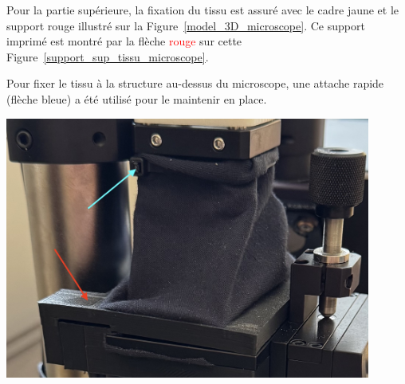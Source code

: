 \begin{minipage}[c]{0.48\textwidth}
    Pour la partie supérieure, la fixation du tissu est assuré avec le cadre \textcolor[RGB]{233, 173, 56}{jaune} et le support \textcolor[RGB]{170, 50, 50}{rouge} illustré sur la Figure~\ref{model_3D_microscope}. Ce support imprimé est montré par la flèche \textcolor{red}{rouge} sur cette Figure~\ref{support_sup_tissu_microscope}.

    \vspace{1em}
    Pour fixer le tissu à la structure au-dessus du microscope, une attache rapide (flèche \textcolor[RGB]{115, 210, 210}{bleue}) a été utilisé pour le maintenir en place.

\end{minipage}\hfill
\begin{minipage}[c]{0.48\textwidth}
    \begin{center}
        \includegraphics[width=0.9\textwidth]{assets/figures/Protections_laser/Securite_mecanique/Protection_vers_microscope/support_sup_tissu_microscope.jpeg}
    \end{center}
    \label{support_sup_tissu_microscope}
\end{minipage}

